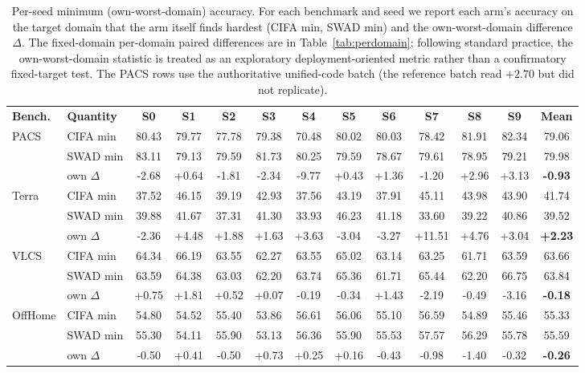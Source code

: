 \documentclass[electronics,article,submit,moreauthors]{Definitions/mdpi}
\begin{document}
\begin{table}[H]
\caption{Per-seed minimum (own-worst-domain) accuracy. For each benchmark and seed we report each arm's accuracy on the target domain that the arm itself finds hardest (CIFA min, SWAD min) and the own-worst-domain difference $\Delta$. The fixed-domain per-domain paired differences are in Table~\ref{tab:perdomain}; following standard practice, the own-worst-domain statistic is treated as an exploratory deployment-oriented metric rather than a confirmatory fixed-target test. The PACS rows use the authoritative unified-code batch (the reference batch read $+2.70$ but did not replicate).}
\label{tab:worst}
\setlength{\tabcolsep}{3.4pt}
\footnotesize
\begin{tabular}{llccccccccccc}
\toprule
\textbf{Bench.} & \textbf{Quantity} & \textbf{S0} & \textbf{S1} & \textbf{S2} & \textbf{S3} & \textbf{S4} & \textbf{S5} & \textbf{S6} & \textbf{S7} & \textbf{S8} & \textbf{S9} & \textbf{Mean}\\
PACS & CIFA min & 80.43 & 79.77 & 77.78 & 79.38 & 70.48 & 80.02 & 80.03 & 78.42 & 81.91 & 82.34 & 79.06 \\
 & SWAD min & 83.11 & 79.13 & 79.59 & 81.73 & 80.25 & 79.59 & 78.67 & 79.61 & 78.95 & 79.21 & 79.98 \\
 & own $\Delta$ & -2.68 & +0.64 & -1.81 & -2.34 & -9.77 & +0.43 & +1.36 & -1.20 & +2.96 & +3.13 & \textbf{-0.93} \\
\midrule
Terra & CIFA min & 37.52 & 46.15 & 39.19 & 42.93 & 37.56 & 43.19 & 37.91 & 45.11 & 43.98 & 43.90 & 41.74 \\
 & SWAD min & 39.88 & 41.67 & 37.31 & 41.30 & 33.93 & 46.23 & 41.18 & 33.60 & 39.22 & 40.86 & 39.52 \\
 & own $\Delta$ & -2.36 & +4.48 & +1.88 & +1.63 & +3.63 & -3.04 & -3.27 & +11.51 & +4.76 & +3.04 & \textbf{+2.23} \\
\midrule
VLCS & CIFA min & 64.34 & 66.19 & 63.55 & 62.27 & 63.55 & 65.02 & 63.14 & 63.25 & 61.71 & 63.59 & 63.66 \\
 & SWAD min & 63.59 & 64.38 & 63.03 & 62.20 & 63.74 & 65.36 & 61.71 & 65.44 & 62.20 & 66.75 & 63.84 \\
 & own $\Delta$ & +0.75 & +1.81 & +0.52 & +0.07 & -0.19 & -0.34 & +1.43 & -2.19 & -0.49 & -3.16 & \textbf{-0.18} \\
\midrule
OffHome & CIFA min & 54.80 & 54.52 & 55.40 & 53.86 & 56.61 & 56.06 & 55.10 & 56.59 & 54.89 & 55.46 & 55.33 \\
 & SWAD min & 55.30 & 54.11 & 55.90 & 53.13 & 56.36 & 55.90 & 55.53 & 57.57 & 56.29 & 55.78 & 55.59 \\
 & own $\Delta$ & -0.50 & +0.41 & -0.50 & +0.73 & +0.25 & +0.16 & -0.43 & -0.98 & -1.40 & -0.32 & \textbf{-0.26} \\
\bottomrule
\end{tabular}
\end{table}
\end{document}
